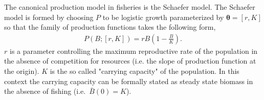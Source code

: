 \documentclass[12pt]{article}
\begin{document}

%

%
The canonical production model in fisheries is the Schaefer model. The 
Schaefer model is formed by choosing $P$ to be logistic growth  %
parameterized by $\bm{\theta} = [r, K]$ so that the family of production 
functions takes the following form,  
%
\begin{align}
P(B; [r, K]) = r B \left(1-\frac{B}{K}\right). \label{logistic}
\end{align}
$r$ is a parameter controlling the maximum reproductive rate of the population 
in the absence of competition for resources (i.e. the slope of production 
function at the origin). $K$ is the so called "carrying capacity" of the 
population. In this context the carrying capacity can be formally stated as 
steady state biomass in the absence of fishing \mbox{(i.e. $\bar B(0)=K$).}  
\end{document}

